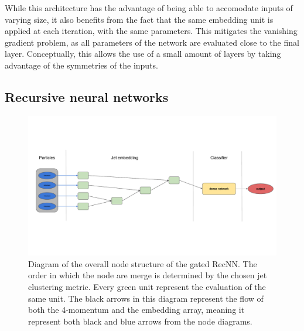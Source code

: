 While this architecture has the advantage of being able to accomodate inputs of varying size, it also benefits from the fact that the same embedding unit is applied at each iteration, with the same parameters. This mitigates the vanishing gradient problem, as all parameters of the network are evaluated close to the final layer. Conceptually, this allows the use of a small amount of layers by taking advantage of the symmetries of the inputs. 

\subsection{Recursive neural networks}
\label{sec:RecNN}


\begin{figure}
    \centering
    \includegraphics[width=\textwidth]{Images/RecNN_diagram_not_parall.pdf}
    \caption{Diagram of the overall node structure of the gated RecNN. The order in which the node are merge is determined by the chosen jet clustering metric. Every green unit represent the evaluation of the same unit. The black arrows in this diagram represent the flow of both the 4-momentum and the embedding array, meaning it represent both black and blue arrows from the node diagrams.}
    \label{fig:recursive_network}
\end{figure}


